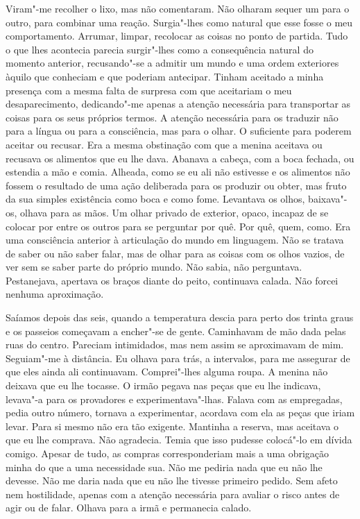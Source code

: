 Viram"-me recolher o lixo, mas não comentaram. Não olharam sequer um
para o outro, para combinar uma reação. Surgia"-lhes como natural que
esse fosse o meu comportamento. Arrumar, limpar, recolocar as coisas no
ponto de partida. Tudo o que lhes acontecia parecia surgir"-lhes como a
consequência natural do momento anterior, recusando"-se a admitir um
mundo e uma ordem exteriores àquilo que conheciam e que poderiam
antecipar. Tinham aceitado a minha presença com a mesma falta de
surpresa com que aceitariam o meu desaparecimento, dedicando"-me apenas
a atenção necessária para transportar as coisas para os seus próprios
termos. A atenção necessária para os traduzir não para a língua ou para
a consciência, mas para o olhar. O suficiente para poderem aceitar ou
recusar. Era a mesma obstinação com que a menina aceitava ou recusava os
alimentos que eu lhe dava. Abanava a cabeça, com a boca fechada, ou
estendia a mão e comia. Alheada, como se eu ali não estivesse e os
alimentos não fossem o resultado de uma ação deliberada para os
produzir ou obter, mas fruto da sua simples existência como boca e como
fome. Levantava os olhos, baixava"-os, olhava para as mãos. Um olhar
privado de exterior, opaco, incapaz de se colocar por entre os outros
para se perguntar por quê. Por quê, quem, como. Era uma consciência
anterior à articulação do mundo em linguagem. Não se tratava de saber ou
não saber falar, mas de olhar para as coisas com os olhos vazios, de ver
sem se saber parte do próprio mundo. Não sabia, não perguntava.
Pestanejava, apertava os braços diante do peito, continuava calada. Não
forcei nenhuma aproximação.

Saíamos depois das seis, quando a temperatura descia para perto dos
trinta graus e os passeios começavam a encher"-se de gente. Caminhavam
de mão dada pelas ruas do centro. Pareciam intimidados, mas nem assim se
aproximavam de mim. Seguiam"-me à distância. Eu olhava para trás, a
intervalos, para me assegurar de que eles ainda ali continuavam.
Comprei"-lhes alguma roupa. A menina não deixava que eu lhe tocasse. O
irmão pegava nas peças que eu lhe indicava, levava"-a para os provadores
e experimentava"-lhas. Falava com as empregadas, pedia outro número,
tornava a experimentar, acordava com ela as peças que iriam levar. Para
si mesmo não era tão exigente. Mantinha a reserva, mas aceitava o que eu
lhe comprava. Não agradecia. Temia que isso pudesse colocá"-lo em dívida
comigo. Apesar de tudo, as compras corresponderiam mais a uma obrigação
minha do que a uma necessidade sua. Não me pediria nada que eu não lhe
devesse. Não me daria nada que eu não lhe tivesse primeiro pedido. Sem
afeto nem hostilidade, apenas com a atenção necessária para avaliar o
risco antes de agir ou de falar. Olhava para a irmã e permanecia calado.

